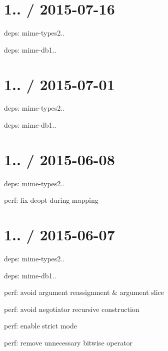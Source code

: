 \section*{1.. / 2015-\/07-\/16 }


\begin{DoxyItemize}
\item deps\+: mime-\/types2..
\begin{DoxyItemize}
\item deps\+: mime-\/db1..
\end{DoxyItemize}
\end{DoxyItemize}

\section*{1.. / 2015-\/07-\/01 }


\begin{DoxyItemize}
\item deps\+: mime-\/types2..
\begin{DoxyItemize}
\item deps\+: mime-\/db1..
\end{DoxyItemize}
\end{DoxyItemize}

\section*{1.. / 2015-\/06-\/08 }


\begin{DoxyItemize}
\item deps\+: mime-\/types2..
\begin{DoxyItemize}
\item perf\+: fix deopt during mapping
\end{DoxyItemize}
\end{DoxyItemize}

\section*{1.. / 2015-\/06-\/07 }


\begin{DoxyItemize}
\item deps\+: mime-\/types2..
\begin{DoxyItemize}
\item deps\+: mime-\/db1..
\end{DoxyItemize}
\item perf\+: avoid argument reassignment \& argument slice
\item perf\+: avoid negotiator recursive construction
\item perf\+: enable strict mode
\item perf\+: remove unnecessary bitwise operator
\end{DoxyItemize}

